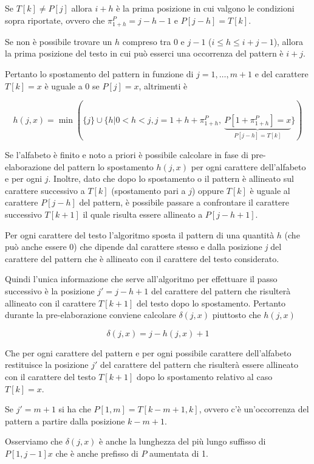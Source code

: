 Se $ T[k] \neq P[j] $ allora $ i+h $ è la prima posizione in cui valgono le condizioni sopra riportate, ovvero che $ \pi_{1+h}^P = j - h -1 $ e $ P[j-h] = T[k] $.

Se non è possibile trovare un $ h $ compreso tra $ 0 $ e $ j-1 $ ($ i \leq h \leq i+j-1 $), allora la prima posizione del testo in cui può esserci una occorrenza del pattern è $ i+j $.

Pertanto lo spostamento del pattern in funzione di $ j = 1, \ldots, m +1 $ e del carattere $ T[k] = x $ è uguale a 0 se $ P[j] = x $, altrimenti è 

$$
h(j,x) = \min(\{j\} \cup \{h | 0 < h < j, j = 1+h + \pi_{1+h}^P, \: \underbrace{P[ 1+ \pi_{1+h}^P] = x}_{P[j-h] = T[k]}\})
$$

Se l'alfabeto è finito e noto a priori è possibile calcolare in fase di pre-elaborazione del pattern lo spostamento $ h(j,x) $ per ogni carattere dell'alfabeto e per ogni $ j $.
Inoltre, dato che dopo lo spostamento o il pattern è allineato sul carattere successivo a $ T[k] $ (spostamento pari a $ j $) oppure $ T[k] $ è uguale al carattere $ P[j-h] $ del pattern, è possibile passare a confrontare il carattere successivo $ T[k+1] $ il quale risulta essere allineato a $ P[j-h+1] $.
 
Per ogni carattere del testo l'algoritmo sposta il pattern di una quantità $ h $ (che può anche essere 0) che dipende dal carattere stesso e dalla posizione \textit{j} del carattere del pattern che è allineato con il carattere del testo considerato.

Quindi l'unica informazione che serve all'algoritmo per effettuare il passo successivo è la posizione $ j' = j - h+ 1 $ del carattere del pattern che risulterà allineato con il carattere $ T[k+1] $ del testo dopo lo spostamento. Pertanto durante la pre-elaborazione conviene calcolare $ \delta(j,x) $ piuttosto che $ h(j,x) $

$$
\delta(j,x) = j - h(j,x)+1
$$

Che per ogni carattere del pattern e per ogni possibile carattere dell'alfabeto restituisce la posizione $ j' $ del carattere del pattern che risulterà essere allineato con il carattere del testo $ T[k+1] $ dopo lo spostamento relativo al caso $ T[k] = x $.

Se $ j' =m+1 $ si ha che $ P[1,m] = T[k-m+1,k] $, ovvero c'è un'occorrenza del pattern a partire dalla posizione $ k -m+1 $.

Osserviamo che $ \delta(j,x) $ è anche la lunghezza del più lungo suffisso di $ P[1,j-1]x $ che è anche prefisso di $ P $ aumentata di 1.


